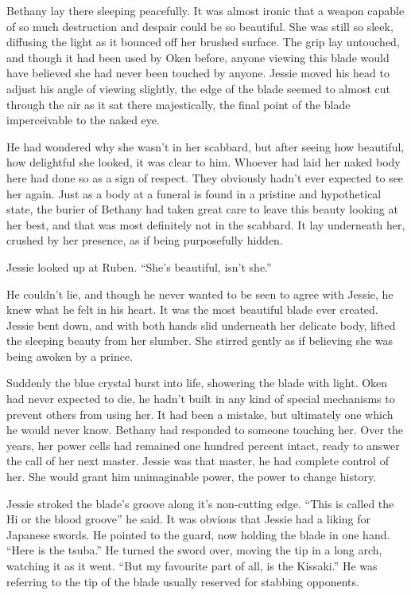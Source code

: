 Bethany lay there sleeping peacefully.  It was almost ironic that a weapon capable of so much destruction and despair could be so beautiful.  She was still so sleek, diffusing the light as it bounced off her brushed surface.  The grip lay untouched, and though it had been used by Oken before, anyone viewing this blade would have believed she had never been touched by anyone.  Jessie moved his head to adjust his angle of viewing slightly, the edge of the blade seemed to almost cut through the air as it sat there majestically, the final point of the blade imperceivable to the naked eye.

He had wondered why she wasn't in her scabbard, but after seeing how beautiful, how delightful she looked, it was clear to him.  Whoever had laid her naked body here had done so as a sign of respect.  They obviously hadn't ever expected to see her again.  Just as a body at a funeral is found in a pristine and hypothetical state, the burier of Bethany had taken great care to leave this beauty looking at her best, and that was most definitely not in the scabbard.  It lay underneath her, crushed by her presence, as if being purposefully hidden.

Jessie looked up at Ruben.  ``She's beautiful, isn't she.''  

He couldn't lie, and though he never wanted to be seen to agree with Jessie, he knew what he felt in his heart.  It was the most beautiful blade ever created.  Jessie bent down, and with both hands slid underneath her delicate body, lifted the sleeping beauty from her slumber.  She stirred gently as if believing she was being awoken by a prince.  

Suddenly the blue crystal burst into life, showering the blade with light.  Oken had never expected to die, he hadn't built in any kind of special mechanisms to prevent others from using her.  It had been a mistake, but ultimately one which he would never know.  Bethany had responded to someone touching her.  Over the years, her power cells had remained one hundred percent intact, ready to answer the call of her next master.  Jessie was that master, he had complete control of her.  She would grant him unimaginable power, the power to change history.

Jessie stroked the blade's groove along it's non-cutting edge.  ``This is called the Hi or the blood groove'' he said.  It was obvious that Jessie had a liking for Japanese swords.  He pointed to the guard, now holding the blade in one hand.  ``Here is the tsuba.''  He turned the sword over, moving the tip in a long arch, watching it as it went.  ``But my favourite part of all, is the Kissaki.''  He was referring to the tip of the blade usually reserved for stabbing opponents.  

